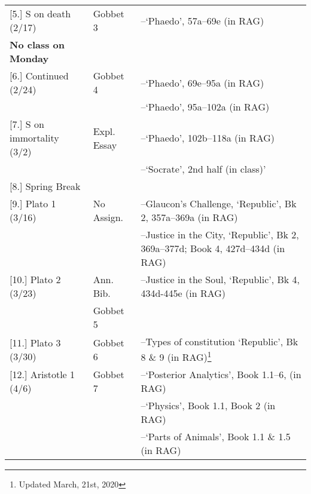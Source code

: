 \documentclass[article,oneside]{memoir}
\begin{document}
\begin{center}
\begin{longtable}{p{4.5cm}p{2cm}p{4.5cm}}
[5.] S on death  (2/17)			& Gobbet 3	    	 & --`Phaedo', 57a--69e (in RAG) \\
\textbf{No class on Monday}						 & 			      & \\ [1.8\baselineskip]  \hline %

[6.] Continued (2/24) 			& 	Gobbet 4          & --`Phaedo', 69e--95a  (in RAG)   \\
						        & 				 & --`Phaedo', 95a--102a  (in RAG) \\ [1.8\baselineskip] \hline
  
[7.] S on immortality (3/2)	  		& Expl. Essay		 & --`Phaedo', 102b--118a  (in RAG)   \\
							& 				 & --`Socrate', 2nd half (in class)' \\ [1.8\baselineskip] \hline

[8.] Spring Break				& 				 &  					\\ [1.8\baselineskip]	\hline


[9.] Plato 1 (3/16)				& No Assign.			& --Glaucon's Challenge, `Republic', Bk 2, 357a--369a (in RAG)  \\ 
							& 	        				& --Justice in the City, `Republic', Bk 2, 369a--377d; Book 4, 427d--434d (in RAG) \\ [1.8\baselineskip] \hline
				     			 


[10.] Plato 2	(3/23)			& Ann. Bib.			&   --Justice in the Soul, `Republic', Bk 4, 434d-445e (in RAG) \\
	         	& Gobbet 5				&   \\  [1.8\baselineskip] \hline

[11.] Plato 3	(3/30)			& Gobbet 6			& --Types of constitution `Republic', Bk 8 \& 9 (in RAG)\footnote{Updated March, 21st, 2020}  \\ [1.8\baselineskip] \hline
                                  			      

[12.] Aristotle 1	(4/6)				& Gobbet 7			& --`Posterior Analytics', Book 1.1--6, (in RAG) \\
						    	&  					& --`Physics', Book 1.1, Book 2 (in RAG) \\
							&					& --`Parts of Animals', Book 1.1 \& 1.5 (in RAG)	 \\ [1.8\baselineskip] \hline
                                    


\end{longtable}
\end{center}
\end{document}

